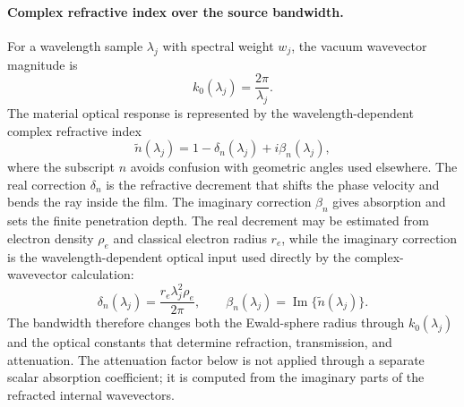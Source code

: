 \documentclass[11pt]{article}
\begin{document}
\paragraph{Complex refractive index over the source bandwidth.}
For a wavelength sample $\lambda_j$ with spectral weight $w_j$, the vacuum wavevector magnitude is
\begin{equation}
  k_0(\lambda_j)=\frac{2\pi}{\lambda_j}.
\end{equation}
The material optical response is represented by the wavelength-dependent complex refractive index
\begin{equation}
  \tilde{n}(\lambda_j)=1-\delta_n(\lambda_j)+i\beta_n(\lambda_j),
  \label{eq:si_complex_n_lambda}
\end{equation}
where the subscript $n$ avoids confusion with geometric angles used elsewhere. The real correction
$\delta_n$ is the refractive decrement that shifts the phase velocity and bends the ray inside the
film. The imaginary correction $\beta_n$ gives absorption and sets the finite penetration depth. The
real decrement may be estimated from electron density $\rho_e$ and classical electron radius $r_e$,
while the imaginary correction is the wavelength-dependent optical input used directly by the
complex-wavevector calculation:
\begin{equation}
  \delta_n(\lambda_j)=\frac{r_e\lambda_j^2\rho_e}{2\pi},
  \qquad
  \beta_n(\lambda_j)=\operatorname{Im}\{\tilde n(\lambda_j)\}.
  \label{eq:si_delta_beta_lambda}
\end{equation}
The bandwidth therefore changes both the Ewald-sphere radius through $k_0(\lambda_j)$ and the
optical constants that determine refraction, transmission, and attenuation. The attenuation factor
below is not applied through a separate scalar absorption coefficient; it is computed from the
imaginary parts of the refracted internal wavevectors.
\end{document}
